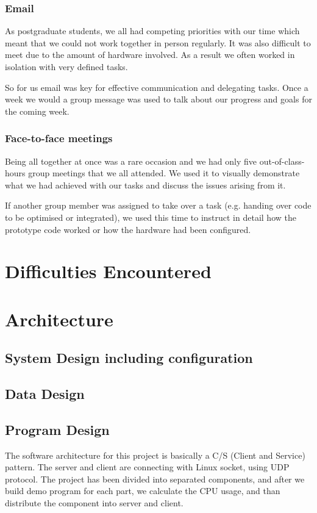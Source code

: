 \documentclass[11pt,a4paper,titlepage]{report}
\begin{document}
\subsubsection{Email}

As postgraduate students, we all had competing priorities with our time which meant that we could not work together in person regularly. It was also difficult to meet due to the amount of hardware involved. As a result we often worked in isolation with very defined tasks.

So for us email was key for effective communication and delegating tasks. Once a week we would a group message was used to talk about our progress and goals for the coming week.

\subsubsection{Face-to-face meetings}

Being all together at once was a rare occasion and we had only five out-of-class-hours group meetings that we all attended. We used it to visually demonstrate what we had achieved with our tasks and discuss the issues arising from it. 

If another group member was assigned to take over a task (e.g. handing over code to be optimised or integrated), we used this time to instruct in detail how the prototype code worked or how the hardware had been configured. 

\section{Difficulties Encountered}
\section{Architecture}
\subsection{System Design including configuration}
\subsection{Data Design}
\subsection{Program Design}


The software architecture for this project is basically a C/S (Client and Service) pattern. The server and client are connecting with Linux socket, using UDP protocol. The project has been divided into separated components, and after we build demo program for each part, we calculate the CPU usage, and than distribute the component into server and client.
\end{document}
